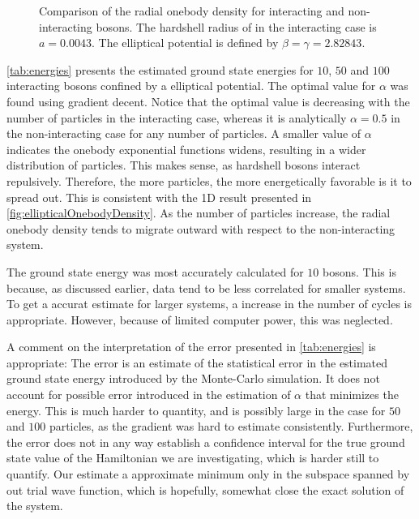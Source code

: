 \begin{figure}
\begin{subfigure}{\textwidth}
	\end{subfigure}%
	\centering
	\caption{Comparison of the radial onebody density for interacting and non-interacting bosons. The hardshell radius of in the interacting case is $a = 0.0043$. The elliptical potential is defined by $\beta = \gamma =  2.82843$. }
	\label{fig:ellipticalOnebodyDensity}
\end{figure}

\autoref{tab:energies} presents the estimated ground state energies for $10$, $50$ and $100$ interacting bosons confined by a elliptical potential. The optimal value for $\alpha$ was found using gradient decent. Notice that the optimal value is decreasing with the number of particles in the interacting case, whereas it is analytically $\alpha = 0.5$ in the non-interacting case for any number of particles. A smaller value of $\alpha$ indicates the onebody exponential functions widens, resulting in a wider distribution of particles. This makes sense, as hardshell bosons interact repulsively. Therefore, the more particles, the more energetically favorable is it to spread out. This is consistent with the 1D result presented in \autoref{fig:ellipticalOnebodyDensity}. As the number of particles increase, the radial onebody density tends to migrate outward with respect to the non-interacting system. 

The ground state energy was most accurately calculated for $10$ bosons. This is because, as discussed earlier, data tend to be less correlated for smaller systems. To get a accurat estimate for larger systems, a increase in the number of cycles is appropriate. However, because of limited computer power, this was neglected. 

A comment on the interpretation of the error presented in \autoref{tab:energies} is appropriate:
The error is an estimate of the statistical error in the estimated ground state energy introduced by the Monte-Carlo simulation. It does not account for possible error introduced in the estimation of $\alpha$ that minimizes the energy. This is much harder to quantity, and is possibly large in the case for $50$ and $100$ particles, as the gradient was hard to estimate consistently. Furthermore, the error does not in any way establish a confidence interval for the true ground state value of the Hamiltonian we are investigating, which is harder still to quantify. Our estimate a approximate minimum only in the subspace spanned by out trial wave function, which is hopefully, somewhat close the exact solution of the system.






